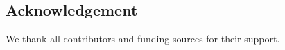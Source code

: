 \begin{adjustwidth}{0.35\textwidth}{0pt}
\section*{Acknowledgement}
We thank all contributors and funding sources for their support.
\end{adjustwidth}
